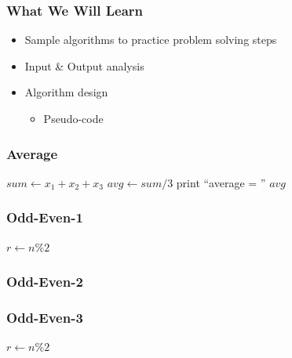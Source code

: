 \documentclass{../c-lecture}
\subtitle{Algorithm Design}
\begin{document}
\begin{frame}
  \frametitle{What We Will Learn}
  \begin{itemize}
    \item Sample algorithms to practice problem solving steps
    \item Input \& Output analysis
    \item Algorithm design
    \begin{itemize}
      \item Pseudo-code
    \end{itemize}
  \end{itemize}
\end{frame}

\begin{frame}
  \frametitle{Average}
  \begin{algorithm}[H]
  $sum \gets x_1 + x_2 + x_3$\;
  $avg \gets sum / 3$\;
  print ``average = '' $avg$ \;
  \end{algorithm}
\end{frame}

\begin{frame}
  \frametitle{Odd-Even-1}
  \begin{algorithm}[H]
  $r \gets n \% 2$\;
  \end{algorithm}
\end{frame}

\begin{frame}
  \frametitle{Odd-Even-2}
  \begin{algorithm}[H]
  \end{algorithm}
\end{frame}

\begin{frame}
  \frametitle{Odd-Even-3}
  \begin{algorithm}[H]
  $r \gets n \% 2$\;
  \end{algorithm}
\end{frame}
\end{document}
